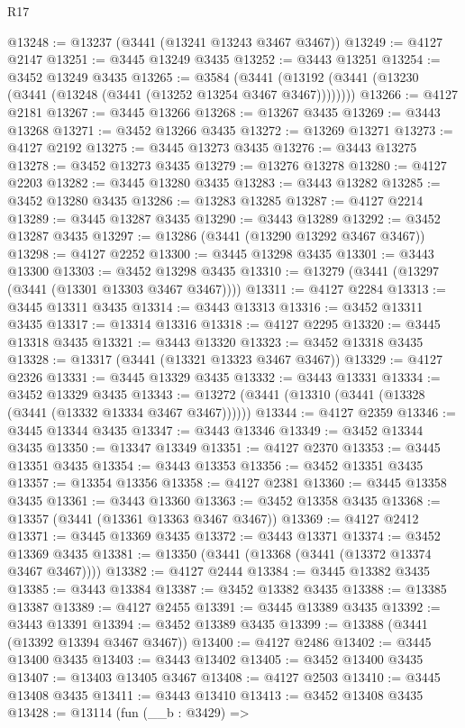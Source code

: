 \begin{lexlean}{R17}
\begin{coremodule}
@13248 := @13237 (@3441 (@13241 @13243 @3467 @3467))
@13249 := @4127 @2147
@13251 := @3445 @13249 @3435
@13252 := @3443 @13251
@13254 := @3452 @13249 @3435
@13265 := @3584
    (@3441 (@13192 (@3441 (@13230 (@3441 (@13248 (@3441 (@13252 @13254 @3467 @3467))))))))
@13266 := @4127 @2181
@13267 := @3445 @13266
@13268 := @13267 @3435
@13269 := @3443 @13268
@13271 := @3452 @13266 @3435
@13272 := @13269 @13271
@13273 := @4127 @2192
@13275 := @3445 @13273 @3435
@13276 := @3443 @13275
@13278 := @3452 @13273 @3435
@13279 := @13276 @13278
@13280 := @4127 @2203
@13282 := @3445 @13280 @3435
@13283 := @3443 @13282
@13285 := @3452 @13280 @3435
@13286 := @13283 @13285
@13287 := @4127 @2214
@13289 := @3445 @13287 @3435
@13290 := @3443 @13289
@13292 := @3452 @13287 @3435
@13297 := @13286 (@3441 (@13290 @13292 @3467 @3467))
@13298 := @4127 @2252
@13300 := @3445 @13298 @3435
@13301 := @3443 @13300
@13303 := @3452 @13298 @3435
@13310 := @13279 (@3441 (@13297 (@3441 (@13301 @13303 @3467 @3467))))
@13311 := @4127 @2284
@13313 := @3445 @13311 @3435
@13314 := @3443 @13313
@13316 := @3452 @13311 @3435
@13317 := @13314 @13316
@13318 := @4127 @2295
@13320 := @3445 @13318 @3435
@13321 := @3443 @13320
@13323 := @3452 @13318 @3435
@13328 := @13317 (@3441 (@13321 @13323 @3467 @3467))
@13329 := @4127 @2326
@13331 := @3445 @13329 @3435
@13332 := @3443 @13331
@13334 := @3452 @13329 @3435
@13343 := @13272 (@3441 (@13310 (@3441 (@13328 (@3441 (@13332 @13334 @3467 @3467))))))
@13344 := @4127 @2359
@13346 := @3445 @13344 @3435
@13347 := @3443 @13346
@13349 := @3452 @13344 @3435
@13350 := @13347 @13349
@13351 := @4127 @2370
@13353 := @3445 @13351 @3435
@13354 := @3443 @13353
@13356 := @3452 @13351 @3435
@13357 := @13354 @13356
@13358 := @4127 @2381
@13360 := @3445 @13358 @3435
@13361 := @3443 @13360
@13363 := @3452 @13358 @3435
@13368 := @13357 (@3441 (@13361 @13363 @3467 @3467))
@13369 := @4127 @2412
@13371 := @3445 @13369 @3435
@13372 := @3443 @13371
@13374 := @3452 @13369 @3435
@13381 := @13350 (@3441 (@13368 (@3441 (@13372 @13374 @3467 @3467))))
@13382 := @4127 @2444
@13384 := @3445 @13382 @3435
@13385 := @3443 @13384
@13387 := @3452 @13382 @3435
@13388 := @13385 @13387
@13389 := @4127 @2455
@13391 := @3445 @13389 @3435
@13392 := @3443 @13391
@13394 := @3452 @13389 @3435
@13399 := @13388 (@3441 (@13392 @13394 @3467 @3467))
@13400 := @4127 @2486
@13402 := @3445 @13400 @3435
@13403 := @3443 @13402
@13405 := @3452 @13400 @3435
@13407 := @13403 @13405 @3467
@13408 := @4127 @2503
@13410 := @3445 @13408 @3435
@13411 := @3443 @13410
@13413 := @3452 @13408 @3435
@13428 := @13114
    (fun (__b : @3429) =>

\end{coremodule}
\end{lexlean}
